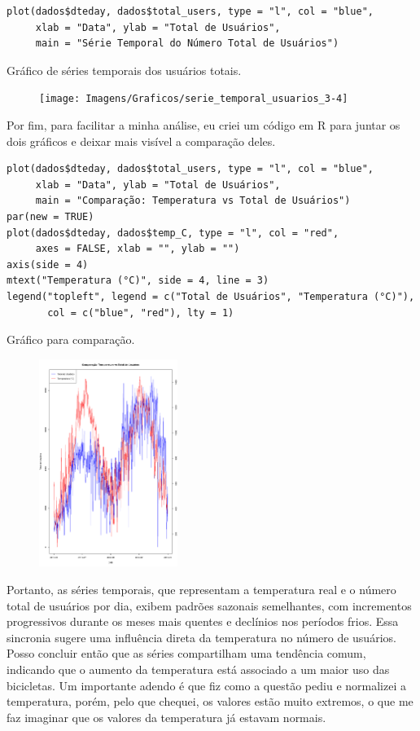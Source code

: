 \documentclass[a4paper,11pt]{article}
\begin{document}
\begin{description}[leftmargin=*]
\begin{lstlisting}
plot(dados$dteday, dados$total_users, type = "l", col = "blue",
     xlab = "Data", ylab = "Total de Usuários",
     main = "Série Temporal do Número Total de Usuários")
\end{lstlisting}

Gráfico de séries temporais dos usuários totais.

\begin{figure}[H] 
    \centering 
    \texttt{[image: Imagens/Graficos/serie\_temporal\_usuarios\_3-4]} 
\end{figure}

Por fim, para facilitar a minha análise, eu criei um código em R para juntar os dois gráficos e deixar mais visível a comparação deles.

\begin{lstlisting}
plot(dados$dteday, dados$total_users, type = "l", col = "blue",
     xlab = "Data", ylab = "Total de Usuários",
     main = "Comparação: Temperatura vs Total de Usuários")
par(new = TRUE)
plot(dados$dteday, dados$temp_C, type = "l", col = "red",
     axes = FALSE, xlab = "", ylab = "")
axis(side = 4)
mtext("Temperatura (°C)", side = 4, line = 3)
legend("topleft", legend = c("Total de Usuários", "Temperatura (°C)"),
       col = c("blue", "red"), lty = 1)
\end{lstlisting}

Gráfico para comparação.

\begin{figure}[H] 
    \centering 
    \includegraphics[width=0.4\textwidth]{Imagens/Graficos/serie_temporal_comparação_3-4.png} 
\end{figure}

Portanto, as séries temporais, que representam a temperatura real e o número total de usuários por dia, exibem padrões sazonais semelhantes, com incrementos progressivos durante os meses mais quentes e declínios nos períodos frios. Essa sincronia sugere uma influência direta da temperatura no número de usuários. Posso concluir então que as séries compartilham uma tendência comum, indicando que o aumento da temperatura está associado a um maior uso das bicicletas. Um importante adendo é que fiz como a questão pediu e normalizei a temperatura, porém, pelo que chequei, os valores estão muito extremos, o que me faz imaginar que os valores da temperatura já estavam normais.

\end{description}

\newpage
\begin{appendices}


\end{appendices}
\end{document}
